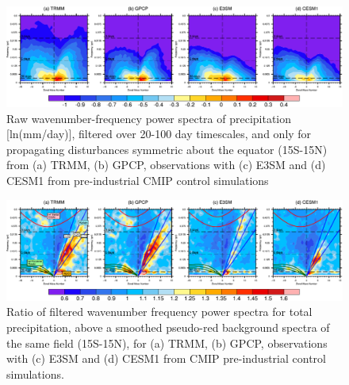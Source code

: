 \documentclass[draft,ms]{AGUTeX}
\begin{document}
\begin{article}
\begin{figure}[t]
  \begin{center}
    \noindent\includegraphics[width=1.1\textwidth,angle=0.]
    {./figs/f_kf_sym_PRECT.pdf}
  \end{center}
  \caption{Raw wavenumber-frequency power spectra \citep[following][]{Wheeler1999} of precipitation [ln(mm/day)], filtered over 20-100 day timescales, and only for propagating disturbances symmetric about the equator (15\deg S-15\deg N) from (a) TRMM, (b) GPCP, observations with (c) E3SM and (d) CESM1 from pre-industrial CMIP control simulations} 
\label{f_kf_sym_PRECT}
\end{figure}

\begin{figure}[fp]
  \begin{center}
    \noindent\includegraphics[width=1.1\textwidth,angle=0.]{./figs/f_kf_sym_ratio_PRECT.pdf}
  \end{center}
  \caption{Ratio of filtered wavenumber frequency power spectra for total precipitation, above a smoothed pseudo-red background spectra of the same field (15\deg S-15\deg N), for (a) TRMM, (b) GPCP, observations with (c) E3SM and (d) CESM1 from CMIP pre-industrial control simulations.} 
\label{f_kf_sym_ratio_PRECT}
\end{figure} 


\end{article}
\end{document}
